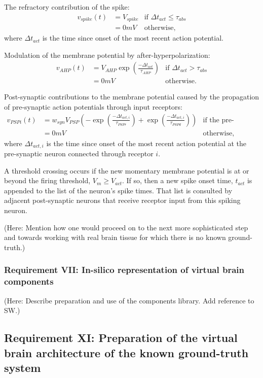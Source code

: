 \documentclass{ldr-article}
\begin{document}
The refractory contribution of the spike:
\begin{eqnarray}
	v_{spike}(t) 	& = V_{spike} & \textrm{if } \Delta t_{act} \le \tau_{abs} \\
					& = 0 mV & \textrm{otherwise,} \nonumber
\end{eqnarray}
where $\Delta t_{act}$ is the time since onset of the most recent action potential.

Modulation of the membrane potential by after-hyperpolarization:
\begin{eqnarray}
	v_{AHP}(t)		& = V_{AHP} \exp(\frac{-\Delta t_{act}}{\tau_{AHP}}) & \textrm{if } \Delta t_{act} > \tau_{abs} \\
					& = 0 mV & \textrm{otherwise.} \nonumber
\end{eqnarray}

Post-synaptic contributions to the membrane potential caused by the propagation of pre-synaptic action potentials through input receptors:
\begin{eqnarray}
	v_{PSPi}(t)		& = w_{syn} V_{PSP} ( -\exp(\frac{-\Delta t_{act,i}}{\tau_{PSPr}}) + \exp(\frac{-\Delta t_{act,i}}{\tau_{PSPd}}) ) & \textrm{if the pre-synaptic neuron has spiked.} \\
					& = 0 mV & \textrm{otherwise,} \nonumber
\end{eqnarray}
where $\Delta t_{act,i}$ is the time since onset of the most recent action potential at the pre-synaptic neuron connected through receptor $i$.

A threshold crossing occurs if the new momentary membrane potential is at or beyond the firing threshold, $V_m \ge V_{act}$. If so, then a new spike onset time, $t_{act}$ is appended to the list of the neuron's spike times. That list is consulted by adjacent post-synaptic neurons that receive receptor input from this spiking neuron.

(Here: Mention how one would proceed on to the next more sophisticated step and towards working with real brain tissue for which there is no known ground-truth.)

\subsubsection{Requirement VII: In-silico representation of virtual brain components}

(Here: Describe preparation and use of the components library. Add reference to SW.)

\subsection{Requirement XI: Preparation of the virtual brain architecture of the known ground-truth system}
\end{document}
